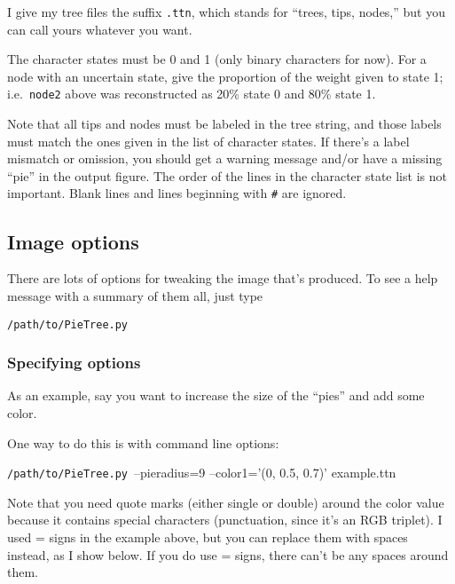 \documentclass[10pt]{article}
\newcommand{\PTpath}{\texttt{/path/to/PieTree.py}\xspace}
\begin{document}
I give my tree files the suffix \texttt{.ttn}, which stands for ``trees, tips, nodes,'' but you can call yours whatever you want.

The character states must be 0 and 1 (only binary characters for now).
For a node with an uncertain state, give the proportion of the weight given to state 1; i.e.\ \texttt{node2} above was reconstructed as 20\% state 0 and 80\% state 1.

Note that all tips and nodes must be labeled in the tree string, and those labels must match the ones given in the list of character states.
If there's a label mismatch or omission, you should get a warning message and/or have a missing ``pie'' in the output figure.
The order of the lines in the character state list is not important.
Blank lines and lines beginning with \texttt{\#} are ignored.


\subsection*{Image options}

There are lots of options for tweaking the image that's produced.
To see a help message with a summary of them all, just type
\begin{commandis}
	\PTpath
\end{commandis}

\subsubsection*{Specifying options}

As an example, say you want to increase the size of the ``pies'' and add some color.

One way to do this is with command line options:
\begin{commandis}
	\PTpath \ --pieradius=9 --color1='(0, 0.5, 0.7)' example.ttn
\end{commandis}
Note that you need quote marks (either single or double) around the color value because it contains special characters (punctuation, since it's an RGB triplet).
I used = signs in the example above, but you can replace them with spaces instead, as I show below.  If you do use = signs, there can't be any spaces around them.
\end{document}
